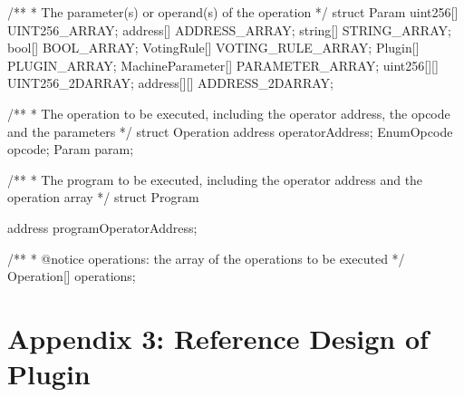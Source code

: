 \documentclass[main.tex]{subfiles}
\begin{document}
\begin{spverbatim}

/**
  * The parameter(s) or operand(s) of the operation
  */
struct Param {
  uint256[] UINT256_ARRAY;
  address[] ADDRESS_ARRAY;
  string[] STRING_ARRAY;
  bool[] BOOL_ARRAY;
  VotingRule[] VOTING_RULE_ARRAY;
  Plugin[] PLUGIN_ARRAY;
  MachineParameter[] PARAMETER_ARRAY;
  uint256[][] UINT256_2DARRAY;
  address[][] ADDRESS_2DARRAY;
}

/**
  * The operation to be executed, including the operator address, the opcode and the parameters
  */
struct Operation {
  address operatorAddress;
  EnumOpcode opcode;
  Param param;
}

/**
  * The program to be executed, including the operator address and the operation array
  */
struct Program {
  address programOperatorAddress;

  /**
   * @notice operations: the array of the operations to be executed
   */
  Operation[] operations;
}

\end{spverbatim}

\section*{Appendix 3: Reference Design of Plugin}
\end{document}
